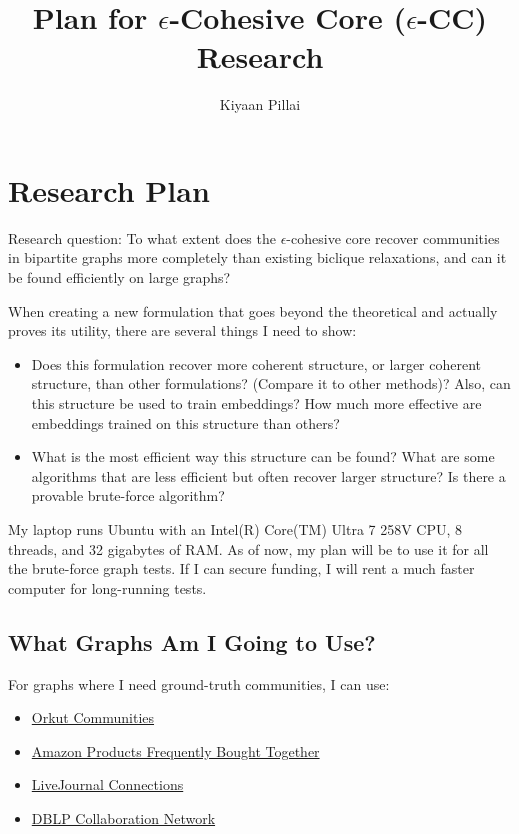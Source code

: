 \documentclass{article}
\title{Plan for $\epsilon$-Cohesive Core ($\epsilon$-CC) Research}
\author{Kiyaan Pillai}
\begin{document}
\section{Research Plan}

Research question: To what extent does the $\epsilon$-cohesive core recover communities in bipartite graphs more completely than existing biclique relaxations, and can it be found efficiently on large graphs?

When creating a new formulation that goes beyond the theoretical and actually proves its utility, there are several things I need to show:

\begin{itemize}
    \item Does this formulation recover more coherent structure, or larger coherent structure, than other formulations? (Compare it to other methods)? Also, can this structure be used to train embeddings? How much more effective are embeddings trained on this structure than others?
    \item What is the most efficient way this structure can be found? What are some algorithms that are less efficient but often recover larger structure? Is there a provable brute-force algorithm?
\end{itemize}

My laptop runs Ubuntu with an Intel(R) Core(TM) Ultra 7 258V CPU, 8 threads, and 32 gigabytes of RAM. As of now, my plan will be to use it for all the brute-force graph tests. If I can secure funding, I will rent a much faster computer for long-running tests.

\subsection{What Graphs Am I Going to Use?}

For graphs where I need ground-truth communities, I can use:

\begin{itemize}
    \item \href{https://snap.stanford.edu/data/com-Orkut.html}{Orkut Communities}
    \item \href{https://snap.stanford.edu/data/com-Amazon.html}{Amazon Products Frequently Bought Together}
    \item \href{https://snap.stanford.edu/data/com-LiveJournal.html}{LiveJournal Connections}
    \item \href{https://snap.stanford.edu/data/com-DBLP.html}{DBLP Collaboration Network}
\end{itemize}
\end{document}
